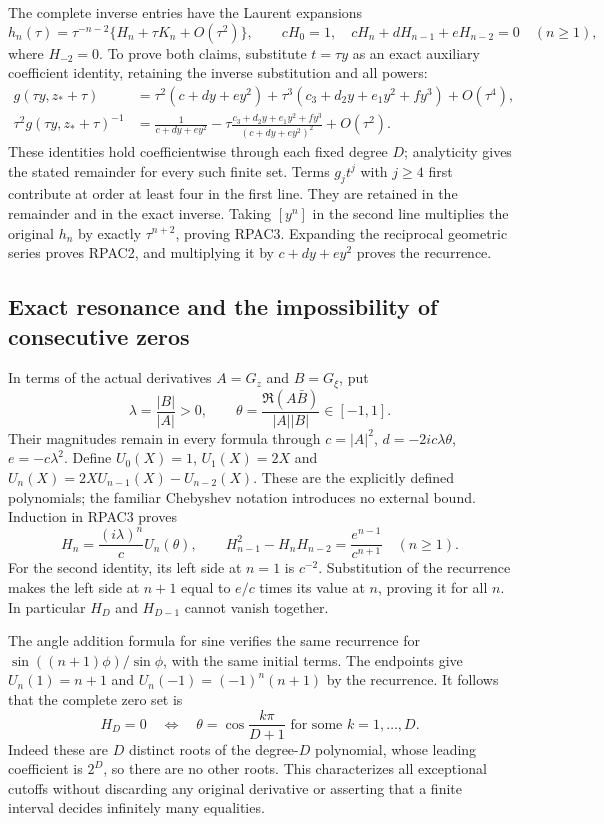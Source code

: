 The complete inverse entries have the Laurent expansions
\[
 h_n(\tau)=\tau^{-n-2}\{H_n+\tau K_n+O(\tau^2)\},\qquad
 cH_0=1,\quad cH_n+dH_{n-1}+eH_{n-2}=0\quad(n\ge1),
 \tag{RPAC3}
\]
where $H_{-2}=0$. To prove both claims, substitute $t=\tau y$
as an exact auxiliary coefficient identity, retaining the inverse
substitution and all powers:
\[
 \begin{aligned}
 g(\tau y,z_*+\tau)
 &=\tau^2(c+dy+ey^2)
   +\tau^3(c_3+d_2y+e_1y^2+fy^3)+O(\tau^4),\\
 \tau^2g(\tau y,z_*+\tau)^{-1}
 &=\frac1{c+dy+ey^2}
 -\tau\frac{c_3+d_2y+e_1y^2+fy^3}{(c+dy+ey^2)^2}
 +O(\tau^2).
 \end{aligned}\tag{RPAC4}
\]
These identities hold coefficientwise through each fixed degree $D$;
analyticity gives the stated remainder for every such finite set.
Terms $g_jt^j$ with $j\ge4$ first contribute at order at least four
in the first line. They are retained in the remainder and in the
exact inverse. Taking $[y^n]$ in the second line multiplies the
original $h_n$ by exactly $\tau^{n+2}$, proving RPAC3.
Expanding the reciprocal geometric series proves RPAC2, and
multiplying it by $c+dy+ey^2$ proves the recurrence.

\subsection{Exact resonance and the impossibility of consecutive zeros}
In terms of the actual derivatives $A=G_z$ and $B=G_\xi$, put
\[
 \lambda=\frac{|B|}{|A|}>0,\qquad
 \theta=\frac{\Re(A\bar B)}{|A||B|}\in[-1,1].\tag{RPAC5}
\]
Their magnitudes remain in every formula through $c=|A|^2$,
$d=-2ic\lambda\theta$, $e=-c\lambda^2$.
Define $U_0(X)=1$, $U_1(X)=2X$ and
$U_n(X)=2XU_{n-1}(X)-U_{n-2}(X)$. These are the explicitly
defined polynomials; the familiar Chebyshev notation introduces
no external bound. Induction in RPAC3 proves
\[
 H_n=\frac{(i\lambda)^n}{c}U_n(\theta),\qquad
 H_{n-1}^2-H_nH_{n-2}=\frac{e^{n-1}}{c^{n+1}}
                      \quad(n\ge1).\tag{RPAC6}
\]
For the second identity, its left side at $n=1$ is $c^{-2}$.
Substitution of the recurrence makes the left side at $n+1$
equal to $e/c$ times its value at $n$, proving it for all $n$.
In particular $H_D$ and $H_{D-1}$ cannot vanish together.

The angle addition formula for sine verifies the same recurrence
for $\sin((n+1)\phi)/\sin\phi$, with the same initial terms.
The endpoints give $U_n(1)=n+1$ and
$U_n(-1)=(-1)^n(n+1)$ by the recurrence. It follows that the
complete zero set is
\[
 H_D=0\quad\Longleftrightarrow\quad
 \theta=\cos\frac{k\pi}{D+1}\text{ for some }k=1,\ldots,D.
 \tag{RPAC7}
\]
Indeed these are $D$ distinct roots of the degree-$D$ polynomial,
whose leading coefficient is $2^D$, so there are no other roots.
This characterizes all exceptional cutoffs without discarding any
original derivative or asserting that a finite interval decides
infinitely many equalities.

